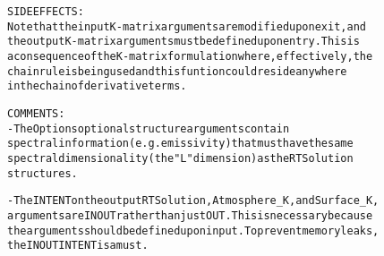 \begin{alltt}
  SIDE EFFECTS:
       Note that the input K-matrix arguments are modified upon exit, and
       the output K-matrix arguments must be defined upon entry. This is
       a consequence of the K-matrix formulation where, effectively, the
       chain rule is being used and this funtion could reside anywhere
       in the chain of derivative terms.
 
  COMMENTS:
        - The Options optional structure arguments contain
          spectral information (e.g. emissivity) that must have the same
          spectral dimensionality (the "L" dimension) as the RTSolution
          structures.
 
        - The INTENT on the output RTSolution, Atmosphere_K, and Surface_K,
          arguments are IN OUT rather than just OUT. This is necessary because
          the arguments should be defined upon input. To prevent memory leaks,
          the IN OUT INTENT is a must.
 
  \end{alltt}

